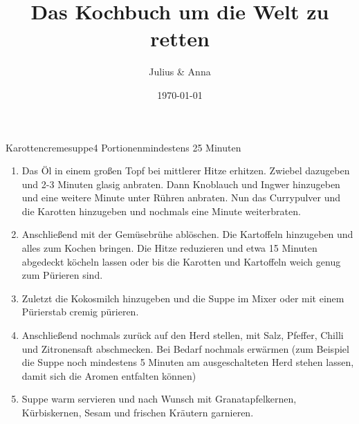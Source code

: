 \documentclass{article}
\title{Das Kochbuch um die Welt zu retten}
\author{Julius \& Anna}
\date{\today}
\begin{document}
\maketitle
\begin{recipe}{Karottencremesuppe}{4 Portionen}{mindestens 25 Minuten}
\begin{enumerate}
  \item Das Öl in einem großen Topf bei mittlerer Hitze erhitzen. Zwiebel dazugeben und 2-3 Minuten glasig anbraten. Dann Knoblauch und Ingwer hinzugeben und eine weitere Minute unter Rühren anbraten. Nun das Currypulver und die Karotten hinzugeben und nochmals eine Minute weiterbraten.
  \item Anschließend mit der Gemüsebrühe ablöschen. Die Kartoffeln hinzugeben und alles zum Kochen bringen. Die Hitze reduzieren und etwa 15 Minuten abgedeckt köcheln lassen oder bis die Karotten und Kartoffeln weich genug zum Pürieren sind.
  \item Zuletzt die Kokosmilch hinzugeben und die Suppe im Mixer oder mit einem Pürierstab cremig pürieren.
  \item Anschließend nochmals zurück auf den Herd stellen, mit Salz, Pfeffer, Chilli und Zitronensaft abschmecken. Bei Bedarf nochmals erwärmen (zum Beispiel die Suppe noch mindestens 5 Minuten am ausgeschalteten Herd stehen lassen, damit sich die Aromen entfalten können)
  \item Suppe warm servieren und nach Wunsch mit Granatapfelkernen, Kürbiskernen, Sesam und frischen Kräutern garnieren.

\end{enumerate}
\end{recipe}
\end{document}
